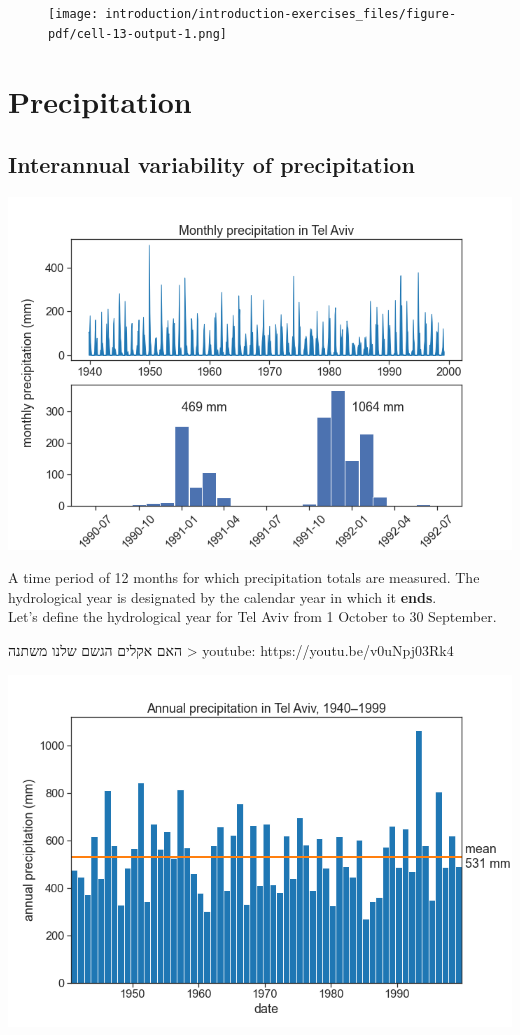 \documentclass[
  letterpaper,
  DIV=11,
  numbers=noendperiod]{scrreprt}
\begin{document}
\begin{figure}[H]

{\centering \texttt{[image: introduction/introduction-exercises\_files/figure-pdf/cell-13-output-1.png]}

}

\end{figure}

\part{Precipitation}

\hypertarget{interannual-variability-of-precipitation}{%
\chapter{Interannual variability of
precipitation}\label{interannual-variability-of-precipitation}}

\includegraphics{archive/figures/monthly_tel_aviv_1940-1999.png}

A time period of 12 months for which precipitation totals are measured.
The hydrological year is designated by the calendar year in which it
\textbf{ends}.\\
Let's define the hydrological year for Tel Aviv from 1 October to 30
September.

האם אקלים הגשם שלנו משתנה \textgreater{} youtube:
https://youtu.be/v0uNpj03Rk4

\includegraphics{archive/figures/annual_tel_aviv_with_mean.png}
\end{document}
